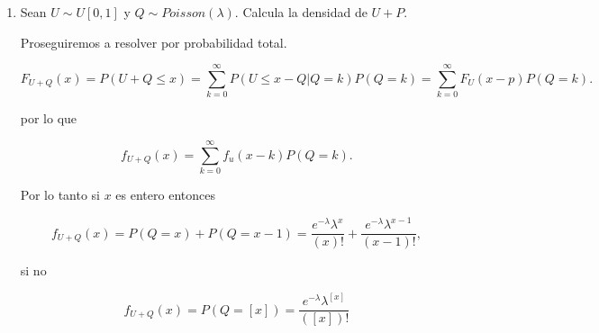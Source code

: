 \documentclass[letterpaper]{article}
\theoremstyle{definition}
\theoremstyle{lemathm}
\theoremstyle{lemademthm}
\begin{document}
\begin{enumerate}
\begin{enumerate}
\begin{enumerate}
\[\begin{array}{cc}
					0 & x < -1\\
					\frac{1}{2} & -1 \leq x \leq 1\\
					1 & 1 \leq x
				
				\end{array}\right.\]

				\item $\alpha \rightarrow -\infty$
				
				Si $X \geq 0$

				\[lim_{\alpha \rightarrow \infty} F_{X_\alpha}(x) = \left\{\begin{array}{cc}
		
					1 & 0 \leq x \leq 1\\
					1 & x \geq 1 
				
				\end{array}\right.\]

				Si $X < 0$

				\[lim_{\alpha \rightarrow \infty} F_{X_\alpha}(x) = \left\{\begin{array}{cc}
				
					0 & (-x) \geq 1\\
					0 & 1 \geq (-x) \geq 0
				
				\end{array}\right.\]

				Es decir

				\[lim_{\alpha \rightarrow \infty} F_{X_\alpha}(x) = \left\{\begin{array}{cc}
		
					1 & 0 \leq x
				
				\end{array}\right.\]

			\end{enumerate}

			\item 

		\end{enumerate}

		\item Sean $U \sim U[0,1]$ y $Q \sim Poisson(\lambda)$. Calcula la densidad de $U + P$.
		
		Proseguiremos a resolver por probabilidad total.

		\[F_{U+Q}(x) = P(U + Q \leq x) = \sum_{k=0}^{\infty} P(U \leq x - Q | Q = k)P(Q = k) = \sum_{k=0}^{\infty} F_U(x-p)P(Q = k).\]

		por lo que

		\[f_{U+Q}(x) = \sum_{k=0}^{\infty} f_u(x-k)P(Q=k).\]

		Por lo tanto si $x$ es entero entonces

		\[f_{U+Q}(x) = P(Q=x) + P(Q=x-1) = \frac{e^{-\lambda} \lambda^{x}}{(x)!} + \frac{e^{-\lambda} \lambda^{x-1}}{(x-1)!},\]

		si no

		\[f_{U+Q}(x) = P(Q=[x]) = \frac{e^{-\lambda} \lambda^{[x]}}{([x])!}\]

    \end{enumerate}

	
\end{document}
